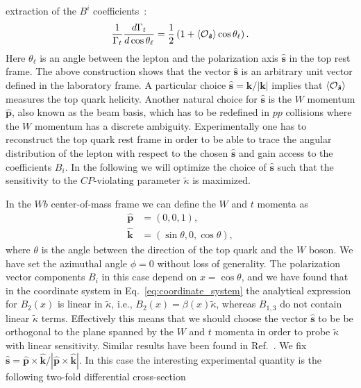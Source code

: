 \documentclass[11pt,a4paper]{article}
\newcommand{\mc}[1]{\mathcal{#1}}
\newcommand{\hvec}[1]{\bm{\hat #1}}
\begin{document}
extraction of the $B^i$ coefficients~\cite{Atwood:2000tu}:
\begin{equation}
\frac{1}{\Gamma_t} \frac{d\Gamma_t}{d\cos\theta_\ell} = \frac{1}{2} \left(1+\Braket{\mc{O}_{\hvec{s}}} \cos \theta_\ell\right).
\end{equation}
Here $\theta_\ell$ is an angle between the lepton and the polarization
axis $\hvec{s}$ in the top rest frame. The above construction shows
that the vector $\hvec{s}$ is an arbitrary unit vector defined in the
laboratory frame. A particular choice $\hvec{s} = \bm{k}/|\bm{k}|$
implies that $\Braket{\mc{O}_{\hvec{s}}}$ measures the top quark
helicity. Another natural choice for $\hvec{s}$ is the $W$ momentum
$\hvec{p}$, also known as the beam basis, which has to be redefined in
$pp$ collisions where the $W$ momentum has a discrete ambiguity.
Experimentally one has to reconstruct the top quark rest frame in
order to be able to trace the angular distribution of the lepton with
respect to the chosen $\hvec{s}$ and gain access to the coefficients
$B_i$. In the following we will optimize the choice of $\hvec{s}$ such
that the sensitivity to the $CP$-violating parameter $\tilde \kappa$
is maximized.



In the $W b$ center-of-mass frame we can define the $W$ and $t$ momenta as
\begin{equation}
\label{eq:coordinate_system}
\begin{split}
\hvec{p} &= (0,0,1), \\
\hvec{k} &= (\sin\theta,0,\cos\theta),
\end{split}
\end{equation}
where $\theta$ is the angle between the direction of the top quark and
the $W$ boson. We have set the azimuthal angle $\phi=0$ without loss
of generality. The polarization vector components $B_i$ in this
case depend on $x=\cos\theta$, and we have found that in the
coordinate system in Eq.~\eqref{eq:coordinate_system} the analytical
expression for $B_2(x)$ is linear in $\tilde{\kappa}$, i.e.,
$B_2(x) = \beta(x) \tilde\kappa$, whereas $B_{1,3}$ do not contain linear $\tilde \kappa$ terms.
Effectively this means that we should
choose the vector $\hvec{s}$ to be be orthogonal to the plane spanned by
the $W$ and $t$ momenta in order to probe $\tilde \kappa$ with linear
sensitivity. Similar results have been found in Ref.~\cite{1807.00281}. We fix
$\hvec{s} = \hvec{p} \times \hvec{k}/|\hvec{p} \times \hvec{k}|$. In
this case the interesting experimental quantity is the following
two-fold differential cross-section
\end{document}
